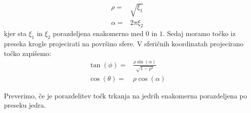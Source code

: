 \documentclass[slovene,11pt,a4paper]{article}
\numberwithin{equation}{section} %
\numberwithin{figure}{section} %
\numberwithin{table}{section} %
\begin{document}
\begin{equation}
\begin{aligned}
\rho= & \sqrt{\xi_1}  \\
\alpha = & 2 \pi \xi_2
\end{aligned}
\end{equation}
kjer sta $\xi_1$ in $\xi_2$ porazdeljena enakomerno med $0$ in $1$. Sedaj moramo točko iz preseka krogle projecirati na površino sfere. V sferičnih koordinatah projecirano točko zapišemo:
\begin{equation}
\label{porazdelitev-kot-sfera-trk}
\begin{aligned}
\tan(\phi)=& \frac{\rho \sin(\alpha)}{\sqrt{1-\rho^2}} \\
\cos(\theta) = & \rho \cos(\alpha)
\end{aligned}
\end{equation}

Preverimo, če je porazdelitev točk trkanja na jedrih enakomerna porazdeljena po preseku jedra.
\end{document}
